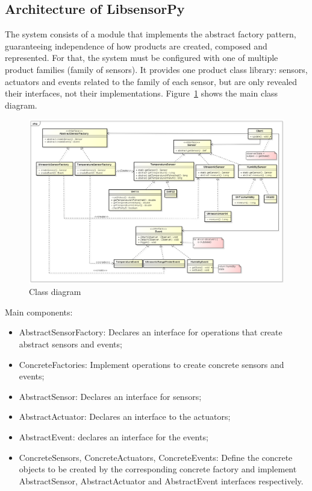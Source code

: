 \documentclass{acm_proc_article-sp}
\begin{document}
\subsection{Architecture of LibsensorPy}
The system consists of a module that implements the abstract factory pattern, guaranteeing independence of how products are created, composed and represented. For that, the system must be configured with one of multiple product families (family of sensors). It provides one product class library: sensors, actuators and events related to the family of each sensor, but are only revealed their interfaces, not their implementations. Figure~\ref{fig:classDiagram} shows the main class diagram.
\begin{figure}[ht]
\centering
    \includegraphics[resolution=300,width=1.0\textwidth,natwidth=610,natheight=642]{pictures/ClassDiagram2.png}
    \caption{Class diagram}
    \label{fig:classDiagram}
\end{figure}
\newline
\newline
Main components:
\begin{itemize}
\item AbstractSensorFactory: Declares an interface for operations that create abstract sensors and events;
\item ConcreteFactories: Implement operations to create concrete sensors and events;
\item AbstractSensor: Declares an interface for sensors;
\item AbstractActuator: Declares an interface to the actuators;
\item AbstractEvent: declares an interface for the events;
\item ConcreteSensors, ConcreteActuators, ConcreteEvents: Define the concrete objects to be created by the corresponding concrete factory and implement AbstractSensor, AbstractActuator and AbstractEvent interfaces respectively.

\end{itemize}
\end{document}
